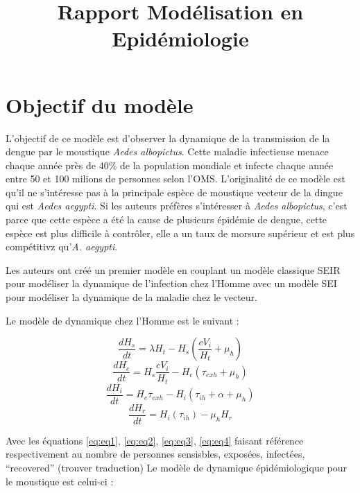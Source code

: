 \documentclass[
  12pt,
  oneside]{article}
\title{Rapport Modélisation en Epidémiologie}
\date{}
\begin{document}
\maketitle

\hypertarget{objectif-du-moduxe8le}{%
\section{Objectif du modèle}\label{objectif-du-moduxe8le}}

L'objectif de ce modèle est d'observer la dynamique de la transmission
de la dengue par le moustique \emph{Aedes albopictus}. Cette maladie
infectieuse menace chaque année près de 40\% de la population mondiale
et infecte chaque année entre 50 et 100 milions de personnes selon
l'OMS. L'originalité de ce modèle est qu'il ne s'intéresse pas à la
principale espèce de moustique vecteur de la dingue qui est \emph{Aedes
aegypti}. Si les auteurs préfères s'intéresser à \emph{Aedes
albopictus}, c'est parce que cette espèce a été la cause de plusieurs
épidémie de dengue, cette espèce est plus difficile à contrôler, elle a
un taux de morsure supérieur et est plus compétitivz qu'\emph{A.
aegypti}.

Les auteurs ont créé un premier modèle en couplant un modèle classique
SEIR pour modéliser la dynamique de l'infection chez l'Homme avec un
modèle SEI pour modéliser la dynamique de la maladie chez le vecteur.

Le modèle de dynamique chez l'Homme est le suivant :

\begin{equation} \frac{dH_s}{dt} = \lambda H_t - H_s \left(\frac{cV_i}{H_t} + \mu_h\right)\label{eq:eq1}\end{equation}
\begin{equation} \frac{dH_e}{dt} = H_s \frac{cV_i}{H_t} - H_e (\tau_{exh} + \mu_h)\label{eq:eq2}\end{equation}
\begin{equation} \frac{dH_i}{dt} = H_e\tau_{exh} - H_i\left(\tau_{ih} + \alpha + \mu_h\right)\label{eq:eq3}\end{equation}
\begin{equation} \frac{dH_r}{dt} = H_i\left(\tau_{ih}\right) - \mu_h H_r\label{eq:eq4}\end{equation}

Avec les équations \ref{eq:eq1}, \ref{eq:eq2}, \ref{eq:eq3},
\ref{eq:eq4} faisant référence respectivement au nombre de personnes
sensisbles, exposées, infectées, ``recovered'' (trouver traduction) Le
modèle de dynamique épidémiologique pour le moustique est celui-ci :
\end{document}
